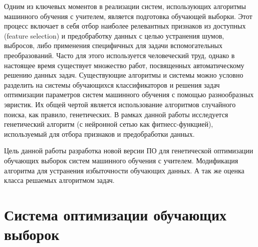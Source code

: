 \documentclass[utf8,usehyperref,14pt]{G7-32}
\begin{document}

\frontmatter %



\tableofcontents


\Introduction

Одним из ключевых моментов в реализации систем, использующих алгоритмы машинного обучения с учителем, является подготовка обучающей выборки. Этот процесс включает в себя отбор наиболее релевантных признаков из доступных (feature selection) и предобработку данных с целью устранения шумов, выбросов, либо применения специфичных для задачи вспомогательных преобразований. Часто для этого используется человеческий труд, однако в настоящее время существует множество работ, посвященных автоматическому решению данных задач. Существующие алгоритмы и системы можно условно разделить на системы обучающихся классификаторов и решения задач оптимизации параметров систем машинного обучения с помощью разнообразных эвристик. Их общей чертой является использование алгоритмов случайного поиска, как правило, генетических. В рамках данной работы исследуется генетический алгоритм (с нейронной сетью как фитнесс-функцией), используемый для отбора признаков и предобработки данных. \cite{HSWGCroatia,Clever_Algorithms,DataMining,GAinClassifier,AI}

Цель данной работы разработка новой версии ПО для генетической оптимизации обучающих выборок систем машинного обучения с учителем. Модификация алгоритма для устранения избыточности обучающих данных. А так же оценка класса решаемых алгоритмом задач.

\mainmatter %
\chapter{Система оптимизации обучающих выборок}
\end{document}
